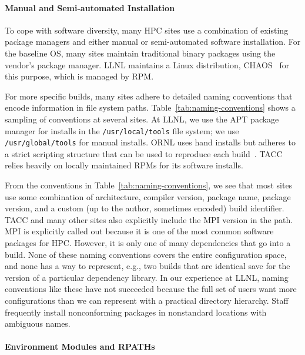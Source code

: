 \paragraph{Manual and Semi-automated Installation}

To cope with software diversity, many HPC sites use a combination of existing
package managers and either manual or semi-automated software installation.  
For the baseline OS, many sites maintain traditional binary
packages using the vendor's package manager. LLNL maintains a Linux 
distribution, CHAOS~\cite{chaos} for this purpose, which is managed by RPM.

For more specific builds, many sites adhere to detailed naming conventions
that encode information in file system paths. 
Table~\ref{tab:naming-conventions} shows a sampling of conventions
at several sites. At LLNL, we use the APT package manager for installs 
in the {\tt /usr/local/tools} file system; we use {\tt /usr/global/tools} 
for manual installs.
ORNL uses hand installs but adheres to a strict scripting structure
that can be used to reproduce each build~\cite{jones+:cug08}.
TACC relies heavily on locally maintained RPMs for its software installs.

From the conventions in Table~\ref{tab:naming-conventions},
we see that most sites use some combination of architecture, compiler version,
package name, package version, and a custom (up to the author, sometimes
encoded) build identifier.  TACC and many other sites also explicitly
include the MPI version in the path. MPI is explicitly called out
because it is one of the most common software packages for HPC.
However, it is only one of many dependencies that go into a build.
None of these naming conventions covers the entire configuration
space, and none has a way to represent, e.g., two builds that are identical
save for the version of a particular dependency library.  In our experience
at LLNL, naming conventions like these have not succeeded because the full
set of users want more configurations than we can represent with a practical
directory hierarchy. Staff frequently install nonconforming packages 
in nonstandard locations with ambiguous names.

\paragraph{Environment Modules and RPATHs}\label{sec:env-rpath}

